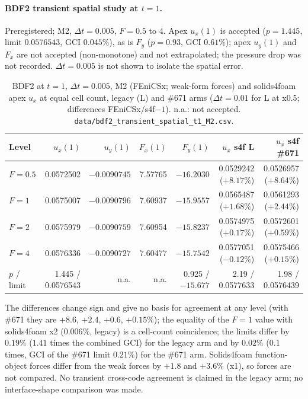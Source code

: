 \documentclass[sn-mathphys,Numbered]{sn-jnl}
\begin{document}
\paragraph{BDF2 transient spatial study at $t=1$.}
Preregistered; M2, $\Delta t=0.005$, $F=0.5$ to $4$. Apex $u_x(1)$ is accepted ($p=1.445$, limit $0.0576543$, GCI $0.045\%$), as is $F_y$ ($p=0.93$, GCI $0.61\%$); apex $u_y(1)$ and $F_x$ are not accepted (non-monotone) and not extrapolated; the pressure drop was not recorded. $\Delta t=0.005$ is not shown to isolate the spatial error.
\begin{table}[htbp]
\centering
\caption{BDF2 at $t=1$, $\Delta t=0.005$, M2 (FEniCSx; weak-form forces) and solids4foam apex $u_x$ at equal cell count, legacy (L) and \#671 arms ($\Delta t=0.01$ for L at x0.5; differences FEniCSx$/$s4f$-1$). n.a.: not accepted. \texttt{data/bdf2\_transient\_spatial\_t1\_M2.csv}.}\label{tab:fx_transient}
\footnotesize\setlength{\tabcolsep}{3pt}
\begin{tabular}{@{}lrrrrrr@{}}
\toprule
Level & $u_x(1)$ & $u_y(1)$ & $F_x(1)$ & $F_y(1)$ & $u_x$ s4f L & $u_x$ s4f \#671 \\
\midrule
$F=0.5$ & 0.0572502 & $-0.0090745$ & 7.57765 & $-16.2030$ & 0.0529242 ($+8.17\%$) & 0.0526957 ($+8.64\%$) \\
$F=1$ & 0.0575007 & $-0.0090796$ & 7.60937 & $-15.9557$ & 0.0565487 ($+1.68\%$) & 0.0561293 ($+2.44\%$) \\
$F=2$ & 0.0575979 & $-0.0090759$ & 7.60954 & $-15.8237$ & 0.0574975 ($+0.17\%$) & 0.0572601 ($+0.59\%$) \\
$F=4$ & 0.0576336 & $-0.0090727$ & 7.60477 & $-15.7542$ & 0.0577051 ($-0.12\%$) & 0.0575466 ($+0.15\%$) \\
$p$ / limit & 1.445 / 0.0576543 & n.a. & n.a. & 0.925 / $-15.677$ & 2.19 / 0.0577633 & 1.98 / 0.0576439 \\
\bottomrule
\end{tabular}
\end{table}
The differences change sign and give no basis for agreement at any level (with \#671 they are $+8.6$, $+2.4$, $+0.6$, $+0.15\%$); the equality of the $F=1$ value with solids4foam x2 ($0.006\%$, legacy) is a cell-count coincidence; the limits differ by $0.19\%$ ($1.41$ times the combined GCI) for the legacy arm and by $0.02\%$ ($0.1$ times, GCI of the \#671 limit $0.21\%$) for the \#671 arm. Solids4foam function-object forces differ from the weak forces by $+1.8$ and $+3.6\%$ (x1), so forces are not compared. No transient cross-code agreement is claimed in the legacy arm; no interface-shape comparison was made.
\end{document}
